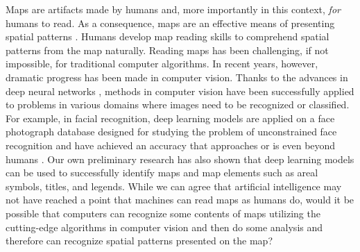 

Maps are artifacts made by humans and, more importantly in this context, {\it for} humans to read. As a consequence, maps are an effective means of presenting spatial patterns \citep{kimerling2016map}. Humans develop map reading skills \citep{presson1982development,gilhooly1988skill} to comprehend spatial patterns from the map naturally. Reading maps has been challenging, if not impossible, for traditional computer algorithms. In recent years, however, dramatic progress has been made in computer vision. Thanks to the advances in deep neural networks \citep{Szeliski2021}, methods in computer vision have been successfully applied to problems in various domains where images need to be recognized or classified. For example, in facial recognition, deep learning models are applied on a face photograph database designed for studying the problem of unconstrained face recognition and have achieved an accuracy that approaches or is even beyond humans \citep{Wang2021}. Our own preliminary research has also shown that deep learning models can be used to successfully identify maps and map elements such as areal symbols, titles, and legends. While we can agree that artificial intelligence may not have reached a point that machines can read maps as humans do, would it be possible that computers can recognize some contents of maps utilizing the cutting-edge algorithms in computer vision and then do some analysis and therefore can recognize spatial patterns presented on the map?

